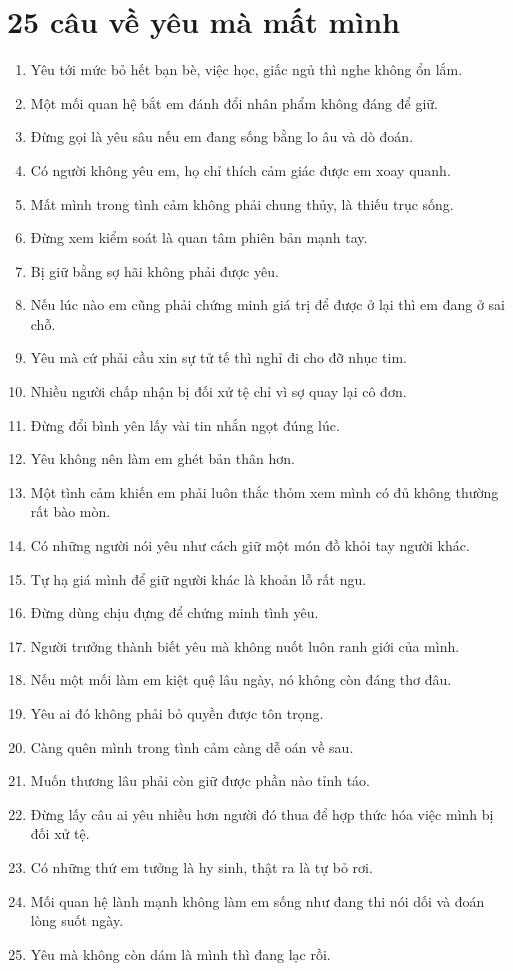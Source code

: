 \section{25 câu về yêu mà mất mình}
\begin{enumerate}[leftmargin=*,resume]
\item Yêu tới mức bỏ hết bạn bè, việc học, giấc ngủ thì nghe không ổn lắm.
\item Một mối quan hệ bắt em đánh đổi nhân phẩm không đáng để giữ.
\item Đừng gọi là yêu sâu nếu em đang sống bằng lo âu và dò đoán.
\item Có người không yêu em, họ chỉ thích cảm giác được em xoay quanh.
\item Mất mình trong tình cảm không phải chung thủy, là thiếu trục sống.
\item Đừng xem kiểm soát là quan tâm phiên bản mạnh tay.
\item Bị giữ bằng sợ hãi không phải được yêu.
\item Nếu lúc nào em cũng phải chứng minh giá trị để được ở lại thì em đang ở sai chỗ.
\item Yêu mà cứ phải cầu xin sự tử tế thì nghỉ đi cho đỡ nhục tim.
\item Nhiều người chấp nhận bị đối xử tệ chỉ vì sợ quay lại cô đơn.
\item Đừng đổi bình yên lấy vài tin nhắn ngọt đúng lúc.
\item Yêu không nên làm em ghét bản thân hơn.
\item Một tình cảm khiến em phải luôn thắc thỏm xem mình có đủ không thường rất bào mòn.
\item Có những người nói yêu như cách giữ một món đồ khỏi tay người khác.
\item Tự hạ giá mình để giữ người khác là khoản lỗ rất ngu.
\item Đừng dùng chịu đựng để chứng minh tình yêu.
\item Người trưởng thành biết yêu mà không nuốt luôn ranh giới của mình.
\item Nếu một mối làm em kiệt quệ lâu ngày, nó không còn đáng thơ đâu.
\item Yêu ai đó không phải bỏ quyền được tôn trọng.
\item Càng quên mình trong tình cảm càng dễ oán về sau.
\item Muốn thương lâu phải còn giữ được phần nào tỉnh táo.
\item Đừng lấy câu ai yêu nhiều hơn người đó thua để hợp thức hóa việc mình bị đối xử tệ.
\item Có những thứ em tưởng là hy sinh, thật ra là tự bỏ rơi.
\item Mối quan hệ lành mạnh không làm em sống như đang thi nói dối và đoán lòng suốt ngày.
\item Yêu mà không còn dám là mình thì đang lạc rồi.
\end{enumerate}

